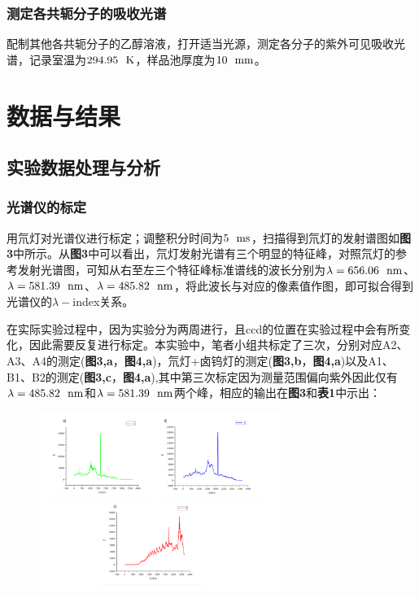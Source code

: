 \documentclass[12pt]{article}
\begin{document}
			\subsubsection{测定各共轭分子的吸收光谱}
			配制其他各共轭分子的乙醇溶液，打开适当光源，测定各分子的紫外可见吸收光谱，记录室温为$294.95 \ \ {\rm K}$，样品池厚度为$10 \ \ {\rm mm}$。


				
    	
	\vbox{}
	 \section{数据与结果}
 		\subsection{实验数据处理与分析}
 			\subsubsection{光谱仪的标定}
			 用氘灯对光谱仪进行标定；调整积分时间为$5\ \ {\rm ms}$，扫描得到氘灯的发射谱图如\textbf{图3}中所示。从\textbf{图3}中可以看出，氘灯发射光谱有三个明显的特征峰，对照氘灯的参考发射光谱图，可知从右至左三个特征峰标准谱线的波长分别为$\lambda=656.06\ \ {\rm nm}$、$\lambda=581.39\ \ {\rm nm}$、$\lambda=485.82\ \ {\rm nm}$，将此波长与对应的像素值作图，即可拟合得到光谱仪的$\lambda-$index关系。\par
			 在实际实验过程中，因为实验分为两周进行，且ccd的位置在实验过程中会有所变化，因此需要反复进行标定。本实验中，笔者小组共标定了三次，分别对应A2、A3、A4的测定(\textbf{图3,a}，\textbf{图4,a})，氘灯+卤钨灯的测定(\textbf{图3,b}，\textbf{图4,a})以及A1、B1、B2的测定(\textbf{图3,c}，\textbf{图4,a}),其中第三次标定因为测量范围偏向紫外因此仅有$\lambda=485.82\ \ {\rm nm}$和$\lambda=581.39\ \ {\rm nm}$两个峰，相应的输出在\textbf{图3}和\textbf{表1}中示出：\par

			\begin{figure}[h]
				\centering
				\includegraphics[width=0.7\textwidth]{3.png}
			\end{figure}
\end{document}
